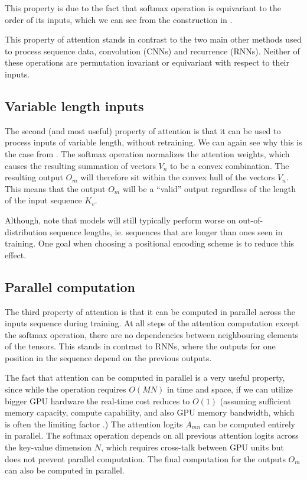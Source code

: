 This property is due to the fact that softmax operation is equivariant to the order of its inputs, which we can see from the construction in .

This property of attention stands in contrast to the two main other methods used to process sequence data, convolution (CNNs) and recurrence (RNNs). Neither of these operations are permutation invariant or equivariant with respect to their inputs.

\subsection{Variable length inputs}

The second (and most useful) property of attention is that it can be used to process inputs of variable length, without retraining. We can again see why this is the case from . The softmax operation normalizes the attention weights, which causes the resulting summation of vectors $V_n$ to be a convex combination. The resulting output $O_m$ will therefore sit within the convex hull of the vectors $V_n$. This means that the output $O_m$ will be a ``valid'' output regardless of the length of the input sequence $K_v$.

Although, note that models will still typically perform worse on out-of-distribution sequence lengths, ie. sequences that are longer than ones seen in training. One goal when choosing a positional encoding scheme is to reduce this effect.

\subsection{Parallel computation}

The third property of attention is that it can be computed in parallel across the inputs sequence during training. At all steps of the attention computation except the softmax operation, there are no dependencies between neighbouring elements of the tensors. This stands in contrast to RNNs, where the outputs for one position in the sequence depend on the previous outputs.

The fact that attention can be computed in parallel is a very useful property, since while the operation requires $O(MN)$ in time and space, if we can utilize bigger GPU hardware the real-time cost reduces to $O(1)$ (assuming sufficient memory capacity, compute capability, and also GPU memory bandwidth, which is often the limiting factor \cite{multi-query-attn}.) The attention logits $A_{mn}$ can be computed entirely in parallel. The softmax operation depends on all previous attention logits across the key-value dimension $N$, which requires cross-talk between GPU units but does not prevent parallel computation. The final computation for the outputs $O_m$ can also be computed in parallel.

